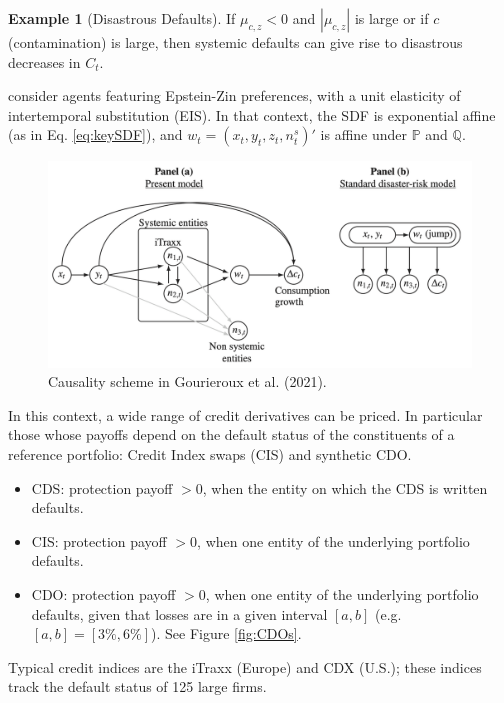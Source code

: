 \documentclass[
  12pt,
]{book}
\providecommand{\tightlist}{%
  \setlength{\itemsep}{0pt}\setlength{\parskip}{0pt}}
\theoremstyle{definition}
\theoremstyle{definition}
\newtheorem{example}{Example}[chapter]
\theoremstyle{definition}
\theoremstyle{definition}
\theoremstyle{remark}
\begin{document}
\begin{example}[Disastrous Defaults]
If \(\mu_{c,z}<0\) and \(|\mu_{c,z}|\) is large or if \(c\) (contamination) is large, then systemic defaults can give rise to disastrous decreases in \(C_t\).

\citet{Gourieroux_Monfort_Mouabbi_Renne_2021} consider agents featuring Epstein-Zin preferences, with a unit elasticity of intertemporal substitution (EIS). In that context, the SDF is exponential affine (as in Eq. \eqref{eq:keySDF}), and \(w_t = (x_t,y_t,z_t,n^{s}_t)'\) is affine under \(\mathbb{P}\) and \(\mathbb{Q}\).

\begin{figure}

{\centering \includegraphics[width=0.9\linewidth]{figures/schemaDD} 

}

\caption{Causality scheme in Gourieroux et al. (2021).}\label{fig:SchemaDD}
\end{figure}

In this context, a wide range of credit derivatives can be priced. In particular those whose payoffs depend on the default status of the constituents of a reference portfolio: Credit Index swaps (CIS) and synthetic CDO.

\begin{itemize}
\tightlist
\item
  CDS: protection payoff \(>0\), when the entity on which the CDS is written defaults.
\item
  CIS: protection payoff \(>0\), when one entity of the underlying portfolio defaults.
\item
  CDO: protection payoff \(>0\), when one entity of the underlying portfolio defaults, given that losses are in a given interval \([a,b]\) (e.g.~\([a,b]=[3\%,6\%]\)). See Figure \ref{fig:CDOs}.
\end{itemize}

Typical credit indices are the iTraxx (Europe) and CDX (U.S.); these indices track the default status of 125 large firms.


\end{example}
\end{document}
